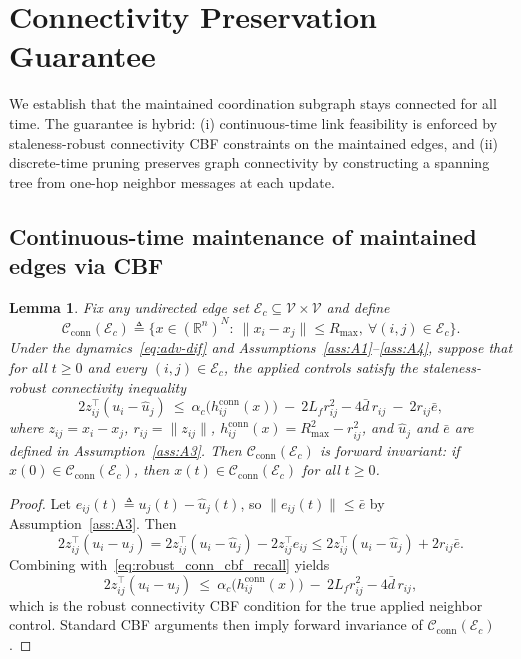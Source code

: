 \documentclass[conference]{IEEEconf}
\theoremstyle{plain}
\newtheorem{lemma}{Lemma}
\begin{document}
\section{Connectivity Preservation Guarantee}
\label{sec:conn_guarantee}

We establish that the maintained coordination subgraph stays connected for all time.
The guarantee is hybrid: (i) continuous-time link feasibility is enforced by staleness-robust connectivity CBF constraints on the maintained edges, and
(ii) discrete-time pruning preserves graph connectivity by constructing a spanning tree from one-hop neighbor messages at each update.

\subsection{Continuous-time maintenance of maintained edges via CBF}
\label{subsec:cbf_link_invariance}

\begin{lemma}
\label{lem:cbf_conn_invariance}
Fix any undirected edge set $\mathcal{E}_c\subseteq \mathcal{V}\times\mathcal{V}$ and define
\[
\mathcal{C}_{\mathrm{conn}}(\mathcal{E}_c)
\triangleq
\Big\{x\in(\mathbb{R}^n)^N:\ \|x_i-x_j\|\le R_{\max},\ \forall (i,j)\in\mathcal{E}_c\Big\}.
\]
Under the dynamics~\eqref{eq:adv-dif} and Assumptions~\ref{ass:A1}--\ref{ass:A4}, suppose that for all $t\ge 0$ and every
$(i,j)\in\mathcal{E}_c$, the applied controls satisfy the staleness-robust connectivity inequality
\begin{equation}
2 z_{ij}^\top (u_i-\hat u_j)\ \le\ \alpha_c\!\big(h^{\mathrm{conn}}_{ij}(x)\big)\ -\ 2L_f r_{ij}^2 - 4\bar d\, r_{ij}\ -\ 2 r_{ij}\bar e,
\label{eq:robust_conn_cbf_recall}
\end{equation}
where $z_{ij}=x_i-x_j$, $r_{ij}=\|z_{ij}\|$, $h^{\mathrm{conn}}_{ij}(x)=R_{\max}^2-r_{ij}^2$, and $\hat u_j$ and $\bar e$ are defined in Assumption~\ref{ass:A3}.
Then $\mathcal{C}_{\mathrm{conn}}(\mathcal{E}_c)$ is forward invariant: if
$x(0)\in\mathcal{C}_{\mathrm{conn}}(\mathcal{E}_c)$, then $x(t)\in\mathcal{C}_{\mathrm{conn}}(\mathcal{E}_c)$ for all $t\ge 0$.
\end{lemma}

\begin{proof}
Let $e_{ij}(t)\triangleq u_j(t)-\hat u_j(t)$, so $\|e_{ij}(t)\|\le \bar e$ by Assumption~\ref{ass:A3}.
Then
\[
2z_{ij}^\top(u_i-u_j)=2z_{ij}^\top(u_i-\hat u_j)-2z_{ij}^\top e_{ij}
\le 2z_{ij}^\top(u_i-\hat u_j)+2r_{ij}\bar e.
\]
Combining with~\eqref{eq:robust_conn_cbf_recall} yields
\[
2z_{ij}^\top(u_i-u_j)\ \le\ \alpha_c\!\big(h^{\mathrm{conn}}_{ij}(x)\big)\ -\ 2L_f r_{ij}^2 - 4\bar d\, r_{ij},
\]
which is the robust connectivity CBF condition for the true applied neighbor control.
Standard CBF arguments then imply forward invariance of $\mathcal{C}_{\mathrm{conn}}(\mathcal{E}_c)$.
\end{proof}
\end{document}
